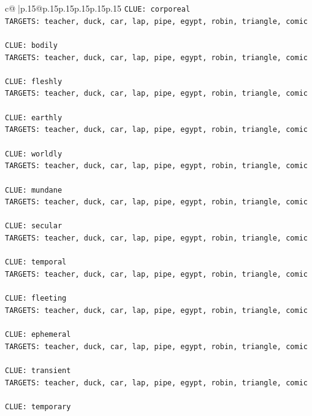 \documentclass{article}
\begin{document}
{\begin{supertabular}{c@{$\;$}|p{.15\linewidth}@{}p{.15\linewidth}p{.15\linewidth}p{.15\linewidth}p{.15\linewidth}p{.15\linewidth}}
{{{\texttt{CLUE: corporeal} \\
\texttt{TARGETS: teacher, duck, car, lap, pipe, egypt, robin, triangle, comic} \\
\\ 
\texttt{CLUE: bodily} \\
\texttt{TARGETS: teacher, duck, car, lap, pipe, egypt, robin, triangle, comic} \\
\\ 
\texttt{CLUE: fleshly} \\
\texttt{TARGETS: teacher, duck, car, lap, pipe, egypt, robin, triangle, comic} \\
\\ 
\texttt{CLUE: earthly} \\
\texttt{TARGETS: teacher, duck, car, lap, pipe, egypt, robin, triangle, comic} \\
\\ 
\texttt{CLUE: worldly} \\
\texttt{TARGETS: teacher, duck, car, lap, pipe, egypt, robin, triangle, comic} \\
\\ 
\texttt{CLUE: mundane} \\
\texttt{TARGETS: teacher, duck, car, lap, pipe, egypt, robin, triangle, comic} \\
\\ 
\texttt{CLUE: secular} \\
\texttt{TARGETS: teacher, duck, car, lap, pipe, egypt, robin, triangle, comic} \\
\\ 
\texttt{CLUE: temporal} \\
\texttt{TARGETS: teacher, duck, car, lap, pipe, egypt, robin, triangle, comic} \\
\\ 
\texttt{CLUE: fleeting} \\
\texttt{TARGETS: teacher, duck, car, lap, pipe, egypt, robin, triangle, comic} \\
\\ 
\texttt{CLUE: ephemeral} \\
\texttt{TARGETS: teacher, duck, car, lap, pipe, egypt, robin, triangle, comic} \\
\\ 
\texttt{CLUE: transient} \\
\texttt{TARGETS: teacher, duck, car, lap, pipe, egypt, robin, triangle, comic} \\
\\ 
\texttt{CLUE: temporary} \\
}}}
\end{supertabular}}
\end{document}

